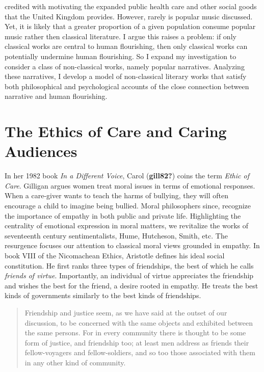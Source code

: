 \documentclass[12pt]{book}
\theoremstyle{definition}
\theoremstyle{remark}
\begin{document}
credited with motivating the expanded public health care and other social goods that the United Kingdom provides. However, rarely is popular music discussed. Yet, it is likely that a greater proportion of a given population consume popular music rather then classical literature. I argue this raises a problem: if only classical works are central to human flourishing, then only classical works can potentially undermine human flourishing. So I expand my investigation to consider a class of non-classical works, namely popular narratives. Analyzing these narratives, I develop a model of non-classical literary works that satisfy both philosophical and psychological accounts of the close connection between narrative and human flourishing.

\section{The Ethics of Care and Caring Audiences}\label{the-ethics-of-care-and-caring-audiences}

In her 1982 book \emph{In a Different Voice}, Carol (\textbf{gill82?}) coins the term \emph{Ethic of Care}. Gilligan argues women treat moral issues in terms of emotional responses. When a care-giver wants to teach the harms of bullying, they will often encourage a child to imagine being bullied. Moral philosophers since, recognize the importance of empathy in both public and private life. Highlighting the centrality of emotional expression in moral matters, we revitalize the works of seventeenth century sentimentalists, Hume, Hutcheson, Smith, etc. The resurgence focuses our attention to classical moral views grounded in empathy. In book VIII of the Nicomachean Ethics, Aristotle defines his ideal social constitution. He first ranks three types of friendships, the best of which he calls \emph{friends of virtue}. Importantly, an individual of virtue appreciates the friendship and wishes the best for the friend, a desire rooted in empathy. He treats the best kinds of governments similarly to the best kinds of friendships.

\begin{quote}
Friendship and justice seem, as we have said at the outset of our discussion, to be concerned with the same objects and exhibited between the same persons. For in every community there is thought to be some form of justice, and friendship too; at least men address as friends their fellow-voyagers and fellow-soldiers, and so too those associated with them in any other kind of community.
\end{quote}
\end{document}
